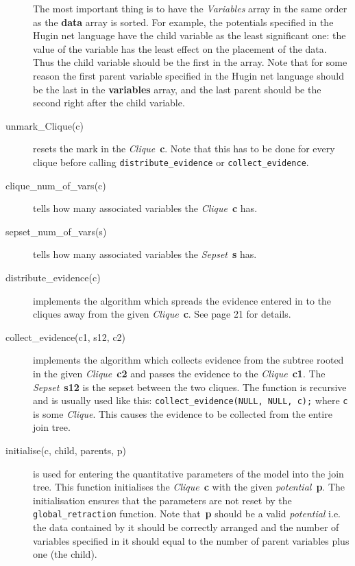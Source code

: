 \documentclass[12pt,a4paper]{report}
\newcommand{\cdatatype}[1]{{\it #1}}
\newcommand{\examplecode}[1]{\texttt{#1}}
\newcommand{\cparameter}[1]{\textbf{#1}}
\newcommand{\cfunction}[1]{\texttt{#1}}
\begin{document}
\begin{description}
The most important thing is to have the \cdatatype{Variables} array in the 
same order as the \cparameter{data} array is sorted. For example, the 
potentials specified in the Hugin net language have the child variable
as the least significant one: the value of the variable has the least 
effect on the placement of the data. Thus the child variable should be 
the first in the array. Note that for some reason the first parent 
variable specified in the Hugin net language should be the last in 
the \cparameter{variables} array, and the last parent should be the 
second right after the child variable.

\item[unmark\_Clique(c)] resets the mark in the 
\cdatatype{Clique}~\cparameter{c}. Note that this has to be done for 
every clique before calling \cfunction{distribute\_evidence} or 
\cfunction{collect\_evidence}.

\item[clique\_num\_of\_vars(c)] tells how many associated variables the 
\cdatatype{Clique}~\cparameter{c} has.

\item[sepset\_num\_of\_vars(s)] tells how many associated variables the 
\cdatatype{Sepset}~\cparameter{s} has.

\item[distribute\_evidence(c)] implements the algorithm which spreads 
the evidence entered in to the cliques away from the given 
\cdatatype{Clique}~\cparameter{c}. See \cite{huang1994} page 21 for
details. 

\item[collect\_evidence(c1, s12, c2)] implements the algorithm which 
collects evidence from the subtree rooted in the given 
\cdatatype{Clique}~\cparameter{c2} and passes the evidence to the 
\cdatatype{Clique}~\cparameter{c1}. The
\cdatatype{Sepset}~\cparameter{s12} is the sepset between the two 
cliques. The function is recursive and is usually used like this: 
\examplecode{collect\_evidence(NULL, NULL, c);} 
where \examplecode{c} is some \cdatatype{Clique}. This causes the 
evidence to be collected from the entire join tree.

\item[initialise(c, child, parents, p)] is used for entering the
quantitative parameters of the model into the join tree. This function
initialises the \cdatatype{Clique}~\cparameter{c} with the given 
\cdatatype{potential}~\cparameter{p}. The initialisation ensures that 
the parameters are not reset by the \cfunction{global\_retraction} 
function. Note that~\cparameter{p} should be a valid 
\cdatatype{potential} i.e. the data contained by it should be 
correctly arranged and the number of variables specified in it should 
equal to the number of parent variables plus one (the child).


\end{description}
\end{document}
